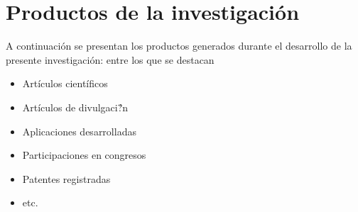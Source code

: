 \section{Productos de la investigaci\'{o}n}
A continuaci\'{o}n  se presentan los productos generados durante el desarrollo de la presente investigaci\'{o}n: entre los que se destacan
\begin{itemize}
\item Art\'{i}culos cient\'{i}ficos
\item Art\'{i}culos de divulgaci\'{?}n
\item Aplicaciones desarrolladas
\item Participaciones en congresos
\item Patentes registradas
\item etc.
\end{itemize}

